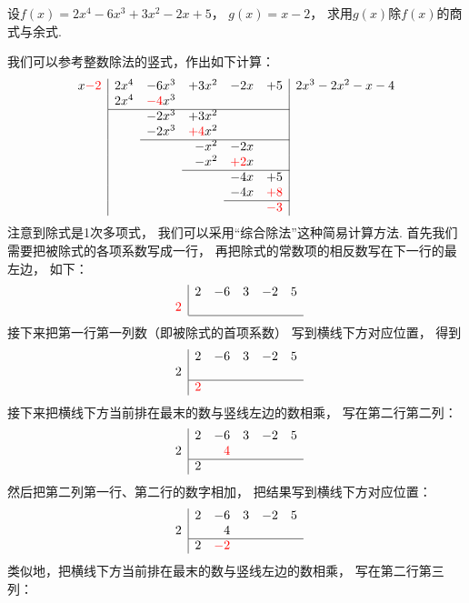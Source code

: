\begin{example}
设\(f(x) = 2x^4-6x^3+3x^2-2x+5\)，
\(g(x) = x-2\)，
求用\(g(x)\)除\(f(x)\)的商式与余式.
\begin{solution}我们可以参考整数除法的竖式，作出如下计算：
\[
	\begin{array}{r|*5r|l}
		x{\color{red}-2} &
		2x^4 & -6x^3 & +3x^2 & -2x & +5
		& 2x^3-2x^2-x-4 \\
		& 2x^4 & {\color{red}-4}x^3 &&&& \\ \cline{2-6}
		&& -2x^3 & +3x^2 &&& \\
		&& -2x^3 & {\color{red}+4}x^2 &&& \\ \cline{3-6}
		&&& -x^2 & -2x && \\
		&&& -x^2 & {\color{red}+2}x && \\ \cline{4-6}
		&&&& -4x & +5 & \\
		&&&& -4x & {\color{red}+8} & \\ \cline{5-6}
		&&&&& {\color{red}-3}
	\end{array}
\]
注意到除式是1次多项式，
我们可以采用“综合除法”这种简易计算方法.
首先我们需要把被除式的各项系数写成一行，
再把除式的常数项的相反数写在下一行的最左边，
如下：\[
	\begin{array}{r|*5r}
		& 2 & -6 & 3 & -2 & 5 \\
		{\color{red}2} \\ \cline{2-6}
	\end{array}
\]
接下来把第一行第一列数（即被除式的首项系数）
写到横线下方对应位置，
得到\[
	\begin{array}{r|*5r}
		& 2 & -6 & 3 & -2 & 5 \\
		2 \\ \cline{2-6}
		& {\color{red}2}
	\end{array}
\]
接下来把横线下方当前排在最末的数与竖线左边的数相乘，
写在第二行第二列：\[
	\begin{array}{r|*5r}
		& 2 & -6 & 3 & -2 & 5 \\
		2 && {\color{red}4} \\ \cline{2-6}
		& 2
	\end{array}
\]
然后把第二列第一行、第二行的数字相加，
把结果写到横线下方对应位置：\[
	\begin{array}{r|*5r}
		& 2 & -6 & 3 & -2 & 5 \\
		2 && 4 \\ \cline{2-6}
		& 2 & {\color{red}-2}
	\end{array}
\]
类似地，把横线下方当前排在最末的数与竖线左边的数相乘，
写在第二行第三列：\[
\]
\end{solution}
\end{example}
